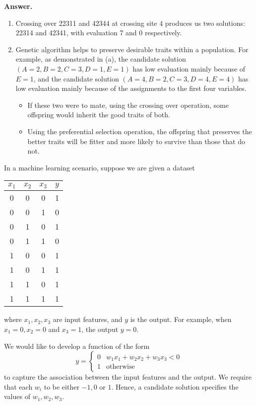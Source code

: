 \documentclass[12pt]{article}
\begin{document}
\begin{Q}
{\bf Answer.}

    \begin{enumerate}
    \item Crossing over 22311 and 42344 at crossing site 4 produces us two solutions: 22314 and 42341, with evaluation 7 and 0 respectively.
    \item Genetic algorithm helps to preserve desirable traits within a population. For example, as demonstrated in (a), the candidate solution $(A=2, B=2,C=3,D=1,E=1)$ has low evaluation mainly because of $E=1$, and the candidate solution $(A=4,B=2,C=3,D=4,E=4)$ has low evaluation mainly because of the assignments to the first four variables.
        \begin{itemize}
        \item If these two were to mate, using the crossing over operation, some offspring would inherit the good traits of both.
        \item Using the preferential selection operation, the offspring that preserves the better traits will be fitter and more likely to survive than those that do not.
        \end{itemize}
    \end{enumerate}



\item In a machine learning scenario, suppose we are given a dataset
\begin{table}[H]\centering
\begin{tabular}{ccc|c}
$x_1$ & $x_2$ & $x_3$ & $y$ \\ \hline
0  & 0 & 0 & 1 \\
0  & 0 & 1 & 0 \\
0  & 1 & 0 & 1 \\
0  & 1 & 1 & 0 \\
1  & 0 & 0 & 1 \\
1  & 0 & 1 & 1 \\
1  & 1 & 0 & 1 \\
1  & 1 & 1 & 1
\end{tabular}
\end{table}
where $x_1,x_2,x_3$ are input features, and $y$ is the output. For example, when $x_1=0,x_2=0$ and $x_3=1$, the output $y=0$.

We would like to develop a function of the form
\[
y=\begin{cases}
    0 & \text{$w_1x_1+w_2x_2+w_3x_3<0$}\\
    1 & \text{otherwise}
\end{cases}
\]
to capture the association between the input features and the output. We require that each $w_i$ to be either $-1,0$ or $1$.
Hence, a candidate solution specifies the values of $w_1,w_2,w_3$.



\end{Q}
\end{document}

